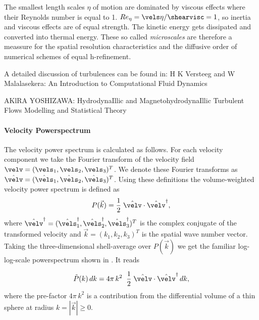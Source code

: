 

The smallest length scales $\eta$ of motion are dominated by viscous effects
where their Reynolds number is equal to 1. $Re_{\eta} = \vels \eta / \shearvisc = 1$,
so inertia and viscous effects are of equal strength. The kinetic energy
gets dissipated and converted into thermal energy. These so called
 \emph{microscales} are therefore a meassure for the spatial
resolution characteristics and the diffusive order of numerical schemes of equal
h-refinement.

A detailed discussion of turbulences can be found in:
H K Versteeg and W Malalasekera: An Introduction to Computational Fluid Dynamics

AKlRA YOSHIZAWA: HydrodynaIllic and MagnetohydrodynaIllic Turbulent Flows Modelling and
Statistical Theory

\paragraph{Velocity Powerspectrum}
The velocity power spectrum is calculated as follows. For each velocity
component we take the Fourier transform of the velocity field $\velv =
(\vels_1, \vels_2, \vels_3)^T$. We denote these Fourier transforms as
$\hat{\velv} = (\hat{\vels}_1, \hat{\vels}_2, \hat{\vels}_3)^T$. Using these
definitions the volume-weighted velocity power spectrum is defined as
\begin{equation}
    P(\vec{k}) = \frac{1}{2} \; \hat{\velv} \cdot \hat{\velv}^{\dagger},
\end{equation}
where $\hat{\velv}^{\dagger} = (\hat{\vels}_1^{\dagger},
\hat{\vels}_2^{\dagger}, \hat{\vels}_3^{\dagger})^T$ is the complex conjugate
of the transformed velocity and $\vec{k} = (k_1,k_2,k_3)^T$ is the spatial wave
number vector. Taking the three-dimensional shell-average over $P(\vec{k})$ we
get the familiar log-log-scale powerspectrum shown in
. It reads

\begin{equation}
    \tilde{P}(k)\,dk = 4 \pi\,k^2 \;\; \frac{1}{2} \; \hat{\velv} \cdot \hat{\velv}^{\dagger}\,dk,
\end{equation}
where the pre-factor $4 \pi\,k^2$ is a contribution from the differential
volume of a thin sphere at radius $k = |\vec{k}| \ge 0$.

